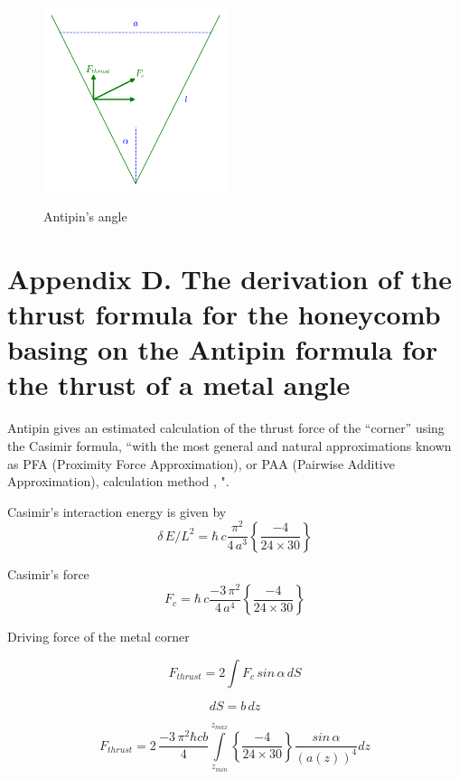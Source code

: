 \documentclass[11pt]{article}
\begin{document}
    \begin{figure}
\begin{center}
\includegraphics[width=0.48\textwidth]{Antipins_angle_en.png}
\caption{}{Antipin's angle}
\end{center}
\label{fig:Antipins_angle}
\end{figure}

    \section{Appendix D. The derivation of the thrust formula for the
honeycomb basing on the Antipin formula for the thrust of a metal
angle}\label{appendix-d.-the-derivation-of-the-thrust-formula-for-the-honeycomb-basing-on-the-antipin-formula-for-the-thrust-of-a-metal-angle}

    Antipin \cite{Antipin2012} gives an estimated calculation of the thrust
force of the ``corner'' using the Casimir formula, ``with the most
general and natural approximations known as PFA (Proximity Force
Approximation), or PAA (Pairwise Additive Approximation), calculation
method \cite{Intravaia2013}, \cite{Rodriguez2011}".

Casimir's interaction energy is given by
\[\delta\,E/L^2 = \hbar\,c\frac{\pi^2}{4\,a^3}\left\{\frac{-4}{24\times30}\right\}\]

Casimir's force
\[F_{c} = \hbar\,c\frac{-3\,\pi^2}{4\,a^4}\left\{\frac{-4}{24\times30}\right\}\]

Driving force of the metal corner

\[F_{thrust} = 2 \int F_{c} \, sin\, \alpha \,dS\]

\[dS = b\,dz\]

\[F_{thrust} = 2\, \frac{-3\,\pi^2\hbar c b}{4}\int\limits_{z_{min}}^{z_{max}} \left\{\frac{-4}{24\times30}\right\}\frac{sin\, \alpha}{\left(a\left(z\right)\right)^4}dz\]
\end{document}
